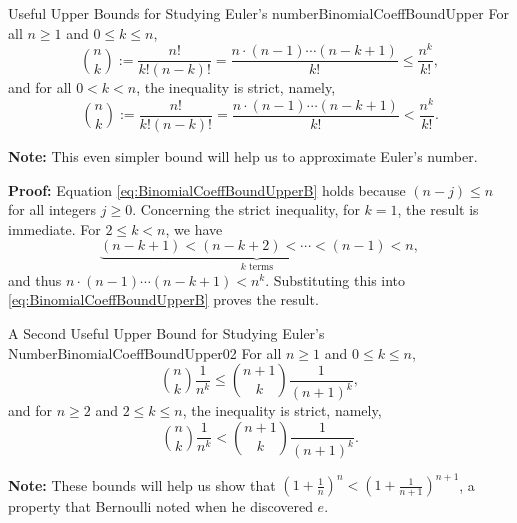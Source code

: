 \begin{propColor}{Useful Upper Bounds for Studying Euler's number}{BinomialCoeffBoundUpper}
For all $n\ge 1$ and $0 \le k \le n$,
\begin{equation}
    \label{eq:BinomialCoeffBoundUpperA}
    \binom{n}{k} := \frac{n!}{k!(n-k)!} = \frac {n \cdot (n-1)\cdots (n-k+1)}{k!} \le  \frac{n^k}{k!},
\end{equation} 
and for all $0 < k < n$, the inequality is strict, namely,
\begin{equation}
    \label{eq:BinomialCoeffBoundUpperB}
    \binom{n}{k} := \frac{n!}{k!(n-k)!} = \frac {n \cdot (n-1)\cdots (n-k+1)}{k!} <  \frac{n^k}{k!}.
\end{equation}

\bigskip 

\textbf{Note:} This even simpler bound will help us to approximate Euler's number.
\end{propColor}




\textbf{Proof:} Equation  \eqref{eq:BinomialCoeffBoundUpperB} holds because $(n-j) \le n $ for all integers $j \ge 0$. Concerning the strict inequality, for $k=1$, the result is immediate.  For $2 \le  k < n$, we have 
$$\underbrace{(n-k+1)< (n-k +2) < \cdots < (n-1) < n}_{k \text{ terms}},$$
and thus $n \cdot (n-1)\cdots (n-k+1) < n^k$.  Substituting this into \eqref{eq:BinomialCoeffBoundUpperB} proves the result.

\Qed


\begin{propColor}{A Second Useful Upper Bound for Studying Euler's Number}{BinomialCoeffBoundUpper02}
For all $n\ge 1$ and $0\le k \le n$,
\begin{equation}
    \label{eq:BinomialCoeffBoundUpper02}
    \binom{n}{k} \frac {1}{n^{k}} \le  \binom{n+1}{k} \frac {1}{\left(n+1 \right)^k},
\end{equation}
and for $n\ge 2$ and $2\le k \le n$, the inequality is strict, namely,
\begin{equation}
    \label{eq:BinomialCoeffBoundUpper03}
    \binom{n}{k} \frac {1}{n^{k}} <  \binom{n+1}{k} \frac {1}{\left(n+1 \right)^k}.
\end{equation}

\bigskip 

\textbf{Note:} These bounds will help us show that $(1 + \frac{1}{n})^n < (1 + \frac{1}{n+1})^{n+1}$, a property that Bernoulli noted when he discovered $e$.
\end{propColor}

